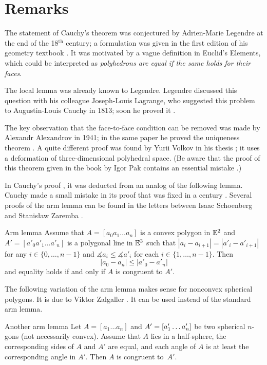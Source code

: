 \section{Remarks}


The statement of Cauchy's theorem was conjectured by Adrien-Marie Legendre at the end of the 18$^\text{th}$ century;
a formulation was given in the first edition of his geometry textbook \cite{legendre}.
It was motivated by a vague definition in Euclid's Elements, which could be interpreted as
\textit{polyhedrons are equal if the same holds for their faces}.

The local lemma was already known to Legendre.
Legendre discussed this question with his colleague Joseph-Louis Lagrange, who suggested this problem to Augustin-Louis Cauchy in 1813; soon he proved it \cite{cauchy}.

The key observation that the face-to-face condition can be removed was made by
Alexandr Alexandrov in 1941; in the same paper he proved the uniqueness theorem \cite{alexandrov-1941}.
A quite different proof was found by Yurii Volkov in his thesis \cite{volkov}; it uses a deformation of three-dimensional polyhedral space.
(Be aware that the proof of this theorem given in the book by Igor Pak contains an essential mistake \cite{petrunin-2023}.)

In Cauchy's proof \cite{cauchy}, it was deducted from an analog of the following lemma.
Cauchy made a small mistake in its proof that was fixed in a century \cite{sabitov}.
Several proofs of the arm lemma can be found in the letters between Isaac Schoenberg and Stanisław Zaremba \cite{schoenberg-zaremba}.

\begin{thm}{Arm lemma}\label{lem:arm}
Assume that $A=[a_0 a_1\dots a_n]$ is a convex polygon in $\mathbb{E}^2$
and $A'=[a'_0 a'_1\dots a'_n]$ is a polygonal line in $\mathbb{E}^3$
such that
$|a_i-a_{i+1}|=|a'_i-a'_{i+1}|$ for any $i\in\{0,\dots,n-1\}$
and
$\measuredangle a_i\le \measuredangle a'_i$
for each $i\in\{1,\dots,n-1\}$.
Then
$$|a_0-a_n|\le |a'_0-a'_n|$$
and equality holds if and only if $A$ is congruent to $A'$.
\end{thm}

The following variation of the arm lemma makes sense for nonconvex spherical polygons.
It is due to Viktor Zalgaller \cite{zalgaller}.
It can be used instead of the standard arm lemma.

\begin{thm}{Another arm lemma}
Let $A=[a_1\dots a_n]$ and $A'=[a'_1\dots a'_n]$ be two spherical $n$-gons (not necessarily convex).
Assume that $A$ lies in a half-sphere,
the corresponding sides of $A$ and $A'$ are equal,
and each angle of $A$ is at least the corresponding angle in $A'$.
Then $A$ is congruent to~$A'$.
\end{thm}

